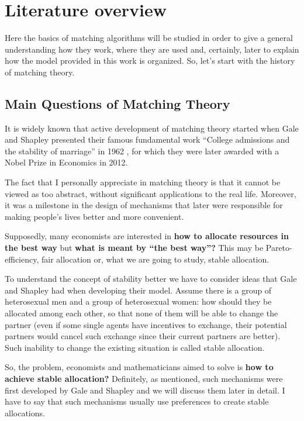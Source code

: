\documentclass[a4paper]{article} %
\begin{document}








\section{Literature overview}
Here the basics of matching algorithms will be studied in order to give a general understanding how they work, where they are used and, certainly, later to explain how the model provided in this work is organized. So, let's start with the history of matching theory.

\subsection{Main Questions of Matching Theory}
It is widely known that active development of matching theory started when Gale and Shapley presented their famous fundamental work “College admissions and the stability of marriage” in 1962 \cite{LastMinuteBidding}, for which they were later awarded with a Nobel Prize in Economics in 2012. 

\hfill 
\break
The fact that I personally appreciate in matching theory is that it cannot be viewed as too abstract, without significant applications to the real life. Moreover, it was a milestone in the design of mechanisms that later were responsible for making people’s lives better and more convenient. 

\hfill 
\break
Supposedly, many economists are interested in \textbf{how to allocate resources in the best way} but \textbf{what is meant by “the best way”?} This may be Pareto-efficiency, fair allocation or, what we are going to study, stable allocation. 

\hfill 
\break
To understand the concept of stability better we have to consider ideas that Gale and Shapley had when developing their model. Assume there is a group of heterosexual men and a group of heterosexual women: how should they be allocated among each other, so that none of them will be able to change the partner (even if some single agents have incentives to exchange, their potential partners would cancel such exchange since their current partners are better). Such inability to change the existing situation is called stable allocation.

\hfill 
\break
So, the problem, economists and mathematicians aimed to solve is \textbf{how to achieve stable allocation?} Definitely, as mentioned, such mechanisms were first developed by Gale and Shapley and we will discuss them later in detail. I have to say that such mechanisms usually use preferences to create stable allocations. 
\end{document}
